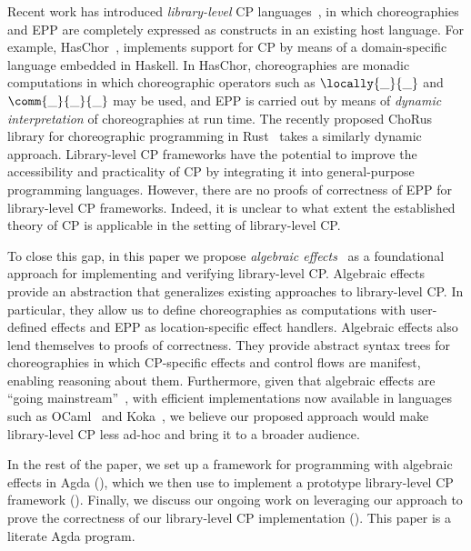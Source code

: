 Recent work has introduced \emph{library-level} CP languages~\citep{shen-2023, kashiwa-2023}, in which choreographies and EPP are completely expressed as constructs in an existing host language.  For example, HasChor~\citep{shen-2023}, implements support for CP by means of a domain-specific language embedded in Haskell.
In HasChor, choreographies are monadic computations in which choreographic operators such as $\locally{\_}{\_}$ and $\comm{\_}{\_}{\_}$ may be used, and EPP is carried out by means of \emph{dynamic interpretation} of choreographies at run time.  The recently proposed ChoRus library for choreographic programming in Rust~\citep{kashiwa-2023} takes a similarly dynamic approach.
%
Library-level CP frameworks have the potential to improve the accessibility and practicality of CP by integrating it into general-purpose programming languages.
%
However, there are no proofs of correctness of EPP for library-level CP frameworks. Indeed, it is unclear to what extent the established theory of CP is applicable in the setting of library-level CP.

To close this gap, in this paper we propose \emph{algebraic effects}~\citep{plotkin-2003, plotkin-2013} as a foundational approach for implementing and verifying library-level CP.
%
Algebraic effects provide an abstraction that generalizes existing approaches to library-level CP.
%
In particular, they allow us to define choreographies as computations with user-defined effects and EPP as location-specific effect handlers.
%
Algebraic effects also lend themselves to proofs of correctness.
%
They provide abstract syntax trees for choreographies in which CP-specific effects and control flows are manifest, enabling reasoning about them.
%
Furthermore, given that algebraic effects are ``going mainstream''~\citep{dagstuhl-alg-effects-report}, with efficient implementations now available in languages such as OCaml~\citep{sivaramakrishnan-ocaml-effect-handlers} and Koka~\citep{leijen-2017}, we believe our proposed approach would make library-level CP less ad-hoc and bring it to a broader audience.


%
In the rest of the paper, we set up a framework for programming with algebraic effects in Agda (), which we then use to implement a prototype library-level CP framework ().  Finally, we discuss our ongoing work on leveraging our approach to prove the correctness of our library-level CP implementation ().  This paper is a literate Agda program.



